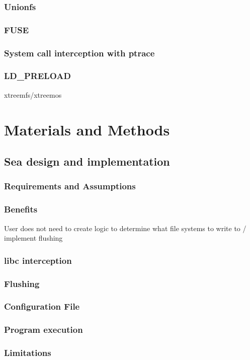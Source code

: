 \documentclass[10pt,journal,compsoc]{IEEEtran}
\begin{document}
\subsubsection{Unionfs}
\subsubsection{FUSE}
\subsubsection{System call interception with ptrace}
\subsubsection{LD\_PRELOAD}
xtreemfs/xtreemos

\section{Materials and Methods}

\subsection{Sea design and implementation}
\subsubsection{Requirements and Assumptions}
\subsubsection{Benefits}
User does not need to create logic to determine what file systems to write to / implement flushing

\subsubsection{libc interception}
\subsubsection{Flushing}
\subsubsection{Configuration File}
\subsubsection{Program execution}
\subsubsection{Limitations}
\end{document}
